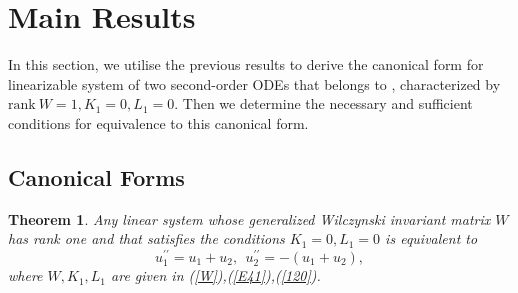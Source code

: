 \documentclass[12pt]{article}
\newtheorem{theorem}{Theorem}[section]
\begin{document}
\section{Main Results}
In this section, we utilise the previous results to derive the canonical form for linearizable system of two second-order ODEs that belongs to , characterized by $\text{rank}~W=1, K_1=0,L_1=0$. Then we determine the necessary and sufficient conditions for equivalence to this canonical form. 
\subsection{Canonical Forms }

\begin{theorem}
Any linear system whose generalized Wilczynski invariant matrix $W$ has rank one and  that satisfies the conditions $K_1=0,L_1=0$ is equivalent to
\begin{equation}\label{cf}
u_1^{\prime\prime}=u_1+u_2,~~u_2^{\prime\prime}=-(u_1+u_2),
\end{equation}
 where  $W,K_1,L_1$ are given in (\ref{W}),(\ref{E41}),(\ref{120}).\end{theorem}
\end{document}
